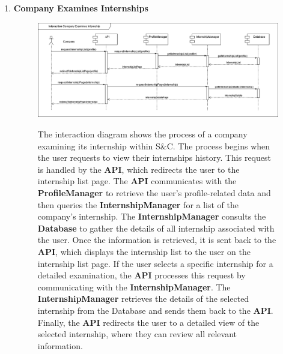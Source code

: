 \begin{enumerate}
    \newpage
    \item \textbf{Company Examines Internships}
    \begin{figure}[h!]
            \centering  \includegraphics[width=1\textwidth]{DD/Images/Interactions/INT12_CompanyExaminesInternships.drawio.png}
            \label{fig:ComponentViewDiagram}
            \caption*{The interaction diagram shows the process of a company examining its internship within S\&C. The process begins when the user requests to view their internships history. This request is handled by the \textbf{API}, which redirects the user to the internship list page. The \textbf{API} communicates with the \textbf{ProfileManager} to retrieve the user’s profile-related data and then queries the \textbf{InternshipManager} for a list of the company’s internship.
            The \textbf{InternshipManager} consults the \textbf{Database} to gather the details of all internship associated with the user. 
            Once the information is retrieved, it is sent back to the \textbf{API}, which displays the internship list to the user on the internship list page.
            If the user selects a specific internship for a detailed examination, the \textbf{API} processes this request by communicating with the \textbf{InternshipManager}. The \textbf{InternshipManager} retrieves the details of the selected internship from the Database and sends them back to the \textbf{API}. Finally, the \textbf{API} redirects the user to a detailed view of the selected internship, where they can review all relevant information.
            }
    \end{figure}


\end{enumerate}
